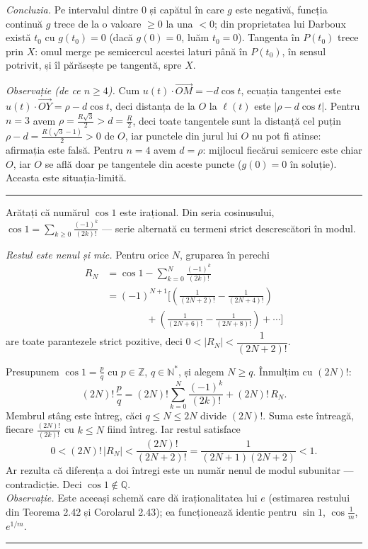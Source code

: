 \emph{Concluzia.} Pe intervalul dintre $0$ și capătul în care $g$ este negativă, funcția continuă $g$ trece de la o valoare $\ge0$ la una $<0$; din proprietatea lui Darboux există $t_0$ cu $g(t_0)=0$ (dacă $g(0)=0$, luăm $t_0=0$). Tangenta în $P(t_0)$ trece prin $X$: omul merge pe semicercul acestei laturi până în $P(t_0)$, în sensul potrivit, și îl părăsește pe tangentă, spre $X$.

\emph{Observație (de ce $n\ge4$).} Cum $u(t)\cdot\overrightarrow{OM}=-d\cos t$, ecuația tangentei este $u(t)\cdot\overrightarrow{OY}=\rho-d\cos t$, deci distanța de la $O$ la $\ell(t)$ este $|\rho-d\cos t|$. Pentru $n=3$ avem $\rho=\frac{R\sqrt3}{2}>d=\frac R2$, deci toate tangentele sunt la distanță cel puțin $\rho-d=\frac{R(\sqrt3-1)}{2}>0$ de $O$, iar punctele din jurul lui $O$ nu pot fi atinse: afirmația este falsă. Pentru $n=4$ avem $d=\rho$: mijlocul fiecărui semicerc este chiar $O$, iar $O$ se află doar pe tangentele din aceste puncte ($g(0)=0$ în soluție). Aceasta este situația-limită.
\vspace{1mm}\hrule

Arătați că numărul $\cos1$ este irațional.
\sol Din seria cosinusului, $\cos1=\displaystyle\sum_{k\ge0}\frac{(-1)^k}{(2k)!}$ --- serie alternată cu termeni strict descrescători în modul.

\emph{Restul este nenul și mic.} Pentru orice $N$, gruparea în perechi
\[ \begin{aligned} R_N&=\cos1-\sum_{k=0}^{N}\frac{(-1)^k}{(2k)!}\\ &=(-1)^{N+1}\biggl[\left(\frac1{(2N+2)!}-\frac1{(2N+4)!}\right)\\ &\qquad\qquad+\left(\frac1{(2N+6)!}-\frac1{(2N+8)!}\right)+\cdots\biggr] \end{aligned} \]
are toate parantezele strict pozitive, deci $0<|R_N|<\dfrac1{(2N+2)!}$.

Presupunem $\cos1=\frac pq$ cu $p\in\mathbb{Z}$, $q\in\mathbb{N}^*$, și alegem $N\ge q$. Înmulțim cu $(2N)!$:
\[ (2N)!\,\frac pq=(2N)!\sum_{k=0}^{N}\frac{(-1)^k}{(2k)!}+(2N)!\,R_N . \]
Membrul stâng este întreg, căci $q\le N\le 2N$ divide $(2N)!$. Suma este întreagă, fiecare $\frac{(2N)!}{(2k)!}$ cu $k\le N$ fiind întreg. Iar restul satisface
\[ 0<(2N)!\,|R_N|<\frac{(2N)!}{(2N+2)!}=\frac1{(2N+1)(2N+2)}<1 . \]
Ar rezulta că diferența a doi întregi este un număr nenul de modul subunitar --- contradicție. Deci $\cos1\notin\mathbb{Q}$.\\[2pt]
\emph{Observație.} Este aceeași schemă care dă iraționalitatea lui $e$ (estimarea restului din Teorema 2.42 și Corolarul 2.43); ea funcționează identic pentru $\sin1$, $\cos\frac1m$, $e^{1/m}$.
\vspace{1mm}\hrule

